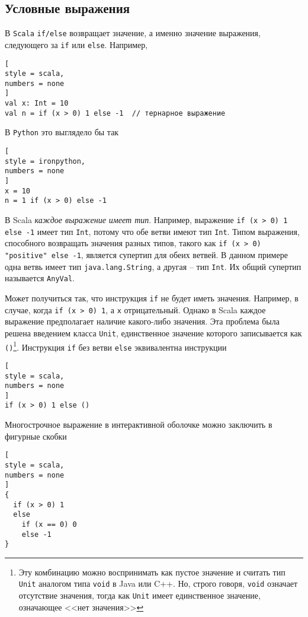 \documentclass[%
	11pt,
	a4paper,
	utf8,
		]{article}
\begin{document}
\subsection{Условные выражения}

В \texttt{Scala} \verb|if/else| возвращает значение, а именно значение выражения, следующего за \texttt{if} или \texttt{else}. Например,
\begin{lstlisting}[
style = scala,
numbers = none
]
val x: Int = 10
val n = if (x > 0) 1 else -1  // тернарное выражение
\end{lstlisting}

В \texttt{Python} это выглядело бы так
\begin{lstlisting}[
style = ironpython,
numbers = none
]
x = 10
n = 1 if (x > 0) else -1
\end{lstlisting}

В Scala \emph{каждое выражение имеет тип}. Например, выражение \verb|if (x > 0) 1 else -1| имеет тип \texttt{Int}, потому что обе ветви имеют тип \texttt{Int}. Типом выражения, способного возвращать значения разных типов, такого как \texttt{if (x > 0) "positive" else -1}, является супертип для обеих ветвей. В данном примере одна ветвь имеет тип \texttt{java.lang.String}, а другая -- тип \texttt{Int}. Их общий супертип называется \texttt{AnyVal}.

Может получиться так, что инструкция \texttt{if} не будет иметь значения. Например, в случае, когда \texttt{if (x > 0) 1}, а \texttt{x} отрицательный. Однако в Scala каждое выражение предполагает наличие какого-либо значения. Эта проблема была решена введением класса \texttt{Unit}, единственное значение которого записывается как \verb|()|\footnote{Эту комбинацию можно воспринимать как пустое значение и считать тип \texttt{Unit} аналогом типа \texttt{void} в Java или C++. Но, строго говоря, \texttt{void} означает отсутствие значения, тогда как \texttt{Unit} имеет единственное значение, означающее <<нет значения>> }. Инструкция \texttt{if} без ветви \texttt{else} эквивалентна инструкции
\begin{lstlisting}[
style = scala,
numbers = none
]
if (x > 0) 1 else ()
\end{lstlisting}

Многострочное выражение в интерактивной оболочке можно заключить в фигурные скобки
\begin{lstlisting}[
style = scala,
numbers = none
]
{
  if (x > 0) 1
  else
    if (x == 0) 0
    else -1
}
\end{lstlisting}
\end{document}
